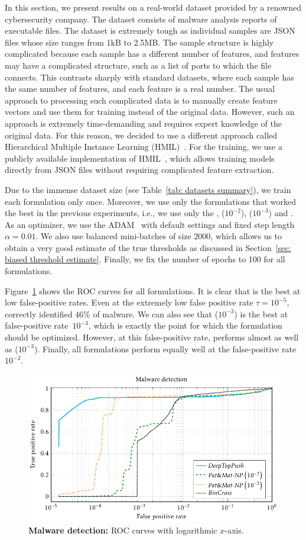 In this section, we present results on a real-world dataset provided by a renowned cybersecurity company. The dataset consists of malware analysis reports of executable files. The dataset is extremely tough as individual samples are JSON files whose size ranges from 1kB to 2.5MB. The sample structure is highly complicated because each sample has a different number of features, and features may have a complicated structure, such as a list of ports to which the file connects. This contrasts sharply with standard datasets, where each sample has the same number of features, and each feature is a real number. The usual approach to processing such complicated data is to manually create feature vectors and use them for training instead of the original data. However, such an approach is extremely time-demanding and requires expert knowledge of the original data. For this reason, we decided to use a different approach called Hierarchical Multiple Instance Learning (HMIL)~\cite{pevny2017using}. For the training, we use a publicly available implementation of HMIL~\cite{mandlik2021mill}, which allows training models directly from JSON files without requiring complicated feature extraction.

Due to the immense dataset size (see Table~\ref{tab: datasets summary}), we train each formulation only once. Moreover, we use only the formulations that worked the best in the previous experiments, i.e., we use only the \BaseLine, \PatMatNP($10^{-2}$), \PatMatNP($10^{-3}$) and \DeepTopPush. As an optimizer, we use the ADAM~\cite{kingma2014adam} with default settings and fixed step length~$\alpha = 0.01.$ We also use balanced mini-batches of size 2000, which allows us to obtain a very good estimate of the true thresholds as discussed in Section~\ref{sec: biased threshold estimate}. Finally, we fix the number of epochs to 100 for all formulations.

Figure~\ref{fig: malware detection} shows the ROC curves for all formulations. It is clear that \DeepTopPush is the best at low false-positive rates. Even at the extremely low false positive rate $\tau=10^{-5}$, \DeepTopPush correctly identified $46\%$ of malware. We can also see that \PatMatNP($10^{-3}$) is the best at false-positive rate~$10^{-3}$, which is exactly the point for which the formulation should be optimized. However, at this false-positive rate, \DeepTopPush performs almost as well as \PatMatNP($10^{-3}$). Finally, all formulations perform equally well at the false-positive rate~$10^{-2}$.

\begin{figure}
  \centering
  \includegraphics{images/malware_detection.pdf}
  \caption{\textbf{Malware detection:} ROC curves with logarithmic $x$-axis.}
  \label{fig: malware detection}
\end{figure}
\hfill
